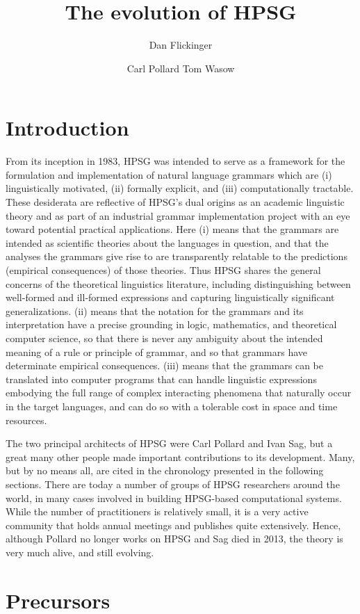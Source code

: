 \documentclass[output=paper]{langsci/langscibook}
\title{The evolution of HPSG}
\author{%
	Dan Flickinger\affiliation{Stanford University}%
	\and Carl Pollard\affiliation{Ohio State Universtiy}
	\lastand Tom Wasow\affiliation{Stanford University}%
}
\begin{document}
\label{chap-evolution}


\section*{Introduction} 

From its inception in 1983, HPSG was intended to serve as a framework for the formulation and implementation of natural language grammars which are (i) linguistically motivated, (ii)
formally explicit, and (iii) computationally tractable. These desiderata are reflective of HPSG's dual origins as an academic linguistic theory and as part of an industrial grammar implementation project with an eye toward potential practical applications. Here (i) means that the grammars are intended as scientific theories about the languages in question, and that the analyses the grammars give rise to are transparently relatable to the predictions (empirical consequences) of those theories. Thus HPSG shares the general concerns of the theoretical linguistics literature, including distinguishing between well-formed and ill-formed expressions and capturing linguistically significant generalizations.  (ii) means that the notation for the grammars and its interpretation have a precise grounding in logic, mathematics, and theoretical computer science, so that there is never any ambiguity about the intended meaning of a rule or principle of grammar, and so that grammars have determinate empirical consequences. (iii) means that the grammars can be translated into computer programs that can handle linguistic expressions embodying the full range of complex interacting phenomena that naturally occur in the target languages, and can do so with a tolerable cost in space and time resources.

The two principal architects of HPSG were Carl Pollard and Ivan Sag, but a great many other people made important contributions to its development.  Many, but by no means all, are cited in the chronology presented in the following sections.  There are today a number of groups of HPSG researchers around the world, in many cases involved in building HPSG-based computational systems.  While the number of practitioners is relatively small, it is a very active community that holds annual meetings and publishes quite extensively.  Hence, although Pollard no longer works on HPSG and Sag died in 2013, the theory is very much alive, and still evolving. 

\section{Precursors}
\end{document}
